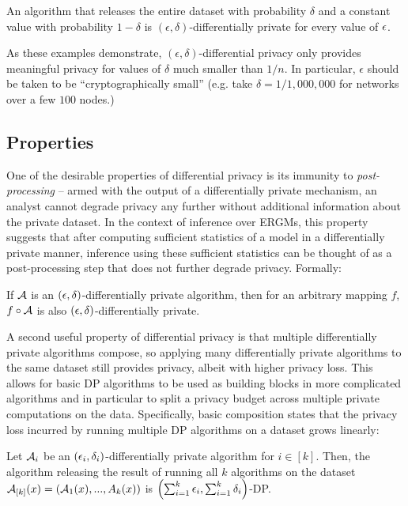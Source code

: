 \begin{example}
	\label{ex:bad_delta2}
	An algorithm that releases the entire dataset with probability $\delta$ and a constant value with probability $1-\delta$ is $(\epsilon, \delta)$-differentially private for every value of $\epsilon$.
\end{example}
As these examples demonstrate, $(\epsilon, \delta)$-differential privacy only provides meaningful privacy for values of $\delta$ much smaller than $1/n$. In particular, $\epsilon$ should be taken to be ``cryptographically small'' (e.g.  take $\delta = 1/1,000,000$ for networks over a few $100$ nodes.)

\subsection*{Properties}

One of the desirable properties of differential privacy is its immunity to \emph{post-processing} -- armed with the output of a differentially private mechanism, an analyst cannot degrade privacy any further without additional information about the private dataset. In the context of inference over ERGMs, this property suggests that after computing sufficient statistics of a model in a differentially private manner, inference using these sufficient statistics can be thought of as a post-processing step that does not further degrade privacy. Formally: 
	\begin{property}
		If $\mathcal{A}$ is an $(\epsilon, \delta)$-differentially private algorithm, then for an arbitrary mapping $f$,  $f \circ \mathcal{A}$ is also $(\epsilon, \delta)$-differentially private. 	
	\end{property}

A second useful property of differential privacy is that multiple differentially private algorithms compose, so applying many differentially private algorithms to the same dataset still provides privacy, albeit with higher privacy loss. This allows for basic DP algorithms to be used as building blocks in more complicated algorithms and in particular to split a privacy budget across multiple private computations on the data. Specifically, basic composition states that the privacy loss incurred by running multiple DP algorithms on a dataset grows linearly:
	\begin{property}
		Let $\mathcal{A}_i$ be an  $(\epsilon_i, \delta_i)$-differentially private algorithm for $i \in [k]$. Then, the algorithm releasing the result of running all $k$ algorithms on the dataset $\mathcal{A}_{[k]}(x) = (\mathcal{A}_1(x),...,A_k(x))$ is $\left(\sum_{i=1}^k \epsilon_i, \sum_{i=1}^k\delta_i\right)$-DP.
	\end{property}



